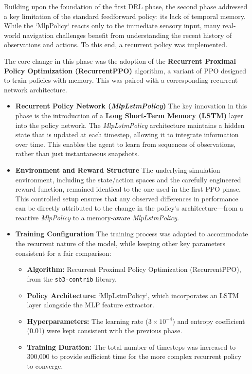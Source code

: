 \documentclass[final,5p,times,twocolumn,authoryear]{elsarticle}
\begin{document}
Building upon the foundation of the first DRL phase, the second phase addressed a key limitation of the standard feedforward policy: its lack of temporal memory. While the `MlpPolicy` reacts only to the immediate sensory input, many real-world navigation challenges benefit from understanding the recent history of observations and actions. To this end, a recurrent policy was implemented.

The core change in this phase was the adoption of the \textbf{Recurrent Proximal Policy Optimization (RecurrentPPO)} algorithm, a variant of PPO designed to train policies with memory. This was paired with a corresponding recurrent network architecture.

\begin{itemize}
    \item \textbf{Recurrent Policy Network (\textit{MlpLstmPolicy})}
        The key innovation in this phase is the introduction of a \textbf{Long Short-Term Memory (LSTM)} layer into the policy network. The \textit{MlpLstmPolicy} architecture maintains a hidden state that is updated at each timestep, allowing it to integrate information over time. This enables the agent to learn from sequences of observations, rather than just instantaneous snapshots.
        
    \item \textbf{Environment and Reward Structure}
        The underlying simulation environment, including the state/action spaces and the carefully engineered reward function, remained identical to the one used in the first PPO phase. This controlled setup ensures that any observed differences in performance can be directly attributed to the change in the policy's architecture—from a reactive \textit{MlpPolicy} to a memory-aware \textit{MlpLstmPolicy}.

    \item \textbf{Training Configuration}
        The training process was adapted to accommodate the recurrent nature of the model, while keeping other key parameters consistent for a fair comparison:
        \begin{itemize}
            \item \textbf{Algorithm:} Recurrent Proximal Policy Optimization (RecurrentPPO), from the \texttt{sb3-contrib} library.
            \item \textbf{Policy Architecture:} `MlpLstmPolicy`, which incorporates an LSTM layer alongside the MLP feature extractor.
            \item \textbf{Hyperparameters:} The learning rate (\(3 \times 10^{-4}\)) and entropy coefficient (0.01) were kept consistent with the previous phase.
            \item \textbf{Training Duration:} The total number of timesteps was increased to 300,000 to provide sufficient time for the more complex recurrent policy to converge.
        \end{itemize}

\end{itemize}
\end{document}
